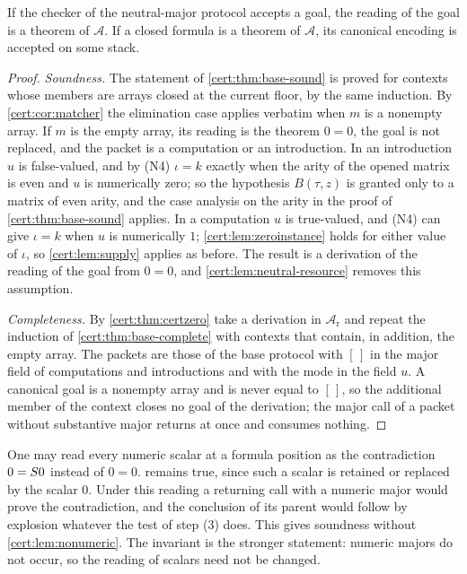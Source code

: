 \begin{theorem}\label{cert:thm:neutral}
If the checker of the neutral-major protocol accepts a goal, the reading of
the goal is a theorem of $\mathcal A$. If a closed formula is a theorem of
$\mathcal A$, its canonical encoding is accepted on some stack.
\end{theorem}
\begin{proof}
\emph{Soundness.} The statement of \cref{cert:thm:base-sound} is proved for
contexts whose members are arrays closed at the current floor, by the same
induction. By \cref{cert:cor:matcher} the elimination case applies verbatim
when $m$ is a nonempty array. If $m$ is the empty array, its reading is the
theorem $0=0$, the goal is not replaced, and the packet is a computation or
an introduction. In an introduction $u$ is false-valued, and by (N4)
$\iota=k$ exactly when the arity of the opened matrix is even and $u$ is
numerically zero; so the hypothesis $B(\tau,z)$ is granted only to a matrix of
even arity, and the case analysis on the arity in the proof of
\cref{cert:thm:base-sound} applies. In a computation $u$ is true-valued, and
(N4) can give $\iota=k$ when $u$ is numerically $1$; \cref{cert:lem:zeroinstance}
holds for either value of $\iota$, so \cref{cert:lem:supply} applies as
before. The result is a derivation of the reading of the goal from $0=0$, and
\cref{cert:lem:neutral-resource} removes this assumption.

\emph{Completeness.} By \cref{cert:thm:certzero} take a derivation in
$\mathcal A_{\mathrm r}$ and repeat the induction of
\cref{cert:thm:base-complete} with contexts that contain, in addition, the
empty array. The packets are those of the base protocol with $[\,]$ in the
major field of computations and introductions and with the mode in the field
$u$. A canonical goal is a nonempty array and is never equal to $[\,]$, so
the additional member of the context closes no goal of the derivation; the
major call of a packet without substantive major returns at once and consumes
nothing.
\end{proof}

\begin{remark}\label{cert:rem:bottom}
One may read every numeric scalar at a formula position as the contradiction
$0=S 0$ instead of $0=0$.  remains true, since such
a scalar is retained or replaced by the scalar $0$. Under this reading a
returning call with a numeric major would prove the contradiction, and the
conclusion of its parent would follow by explosion whatever the test of step
(3) does. This gives soundness without \cref{cert:lem:nonumeric}. The
invariant is the stronger statement: numeric majors do not occur, so the
reading of scalars need not be changed.
\end{remark}

